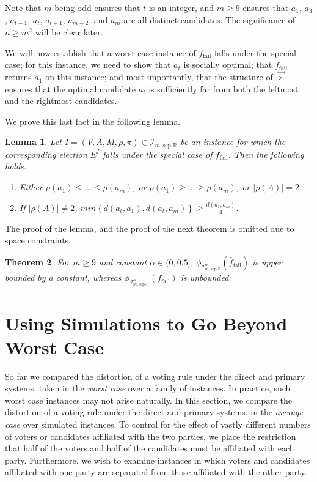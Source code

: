 \documentclass[letterpaper]{article} %
\newtheorem{theorem}{Theorem}
\newtheorem{lemma}[theorem]{Lemma}
\theoremstyle{definition}
\newcommand{\set}[1]{\left\{#1\right\}}
\renewcommand{\vec}{\overrightarrow}
\renewcommand{\hat}{\widehat}
\newcommand{\bbR}{\mathbb{R}}
\newcommand{\calI}{\mathcal{I}}
\newcommand{\vsucc}{\vec{\succ}}
\newcommand{\sep}{\textrm{sep-}}
\newcommand{\eucline}{\bbR}
\newcommand{\euclinesep}{\sep\eucline}
\newcommand{\I}{\calI}
\newcommand{\fail}{{\textrm{fail}}}
\begin{document}
Note that $m$ being odd ensures that $t$ is an integer, and $m \ge 9$ ensures that $a_1$, $a_3$, $a_{t-1}$, $a_t$, $a_{t+1}$, $a_{m-2}$, and $a_m$ are all distinct candidates. The significance of $n \ge m^2$ will be clear later. 

We will now establish that a worst-case instance of $f_\fail$ falls under the special case; for this instance, we need to show that $a_t$ is socially optimal; that $f_\fail$ returns $a_1$ on this instance; and most importantly, that the structure of $\vsucc$ ensures that the optimal candidate $a_t$ is sufficiently far from both the leftmost and the rightmost candidates. 

We prove this last fact in the following lemma. 

\begin{lemma}
	Let $I = (V,A,M,\rho,\pi) \in \I_{m,\euclinesep}$ be an instance for which the corresponding election $E^I$ falls under the special case of $f_\fail$. Then the following holds.
	\begin{enumerate}
		\item Either $\rho(a_1)\leq\ldots\leq\rho(a_{m})$, or $\rho(a_{1})\geq\ldots\geq\rho(a_{m})$, or $|\rho(A)|=2$.%
		\item If $|\rho(A)|\neq 2$, %
		$min\set{d(a_t,a_1),d(a_t,a_m)} \ge \frac{d(a_1,a_m)}{4}$.
	\end{enumerate}
	\label{lem:special-clause}
\end{lemma}

The proof of the lemma, and the proof of the next theorem is omitted due to space constraints.

\begin{theorem}
	For $m \ge 9$ and constant $\alpha \in (0,0.5]$, $\phi_{\I^{\alpha}_{m,\euclinesep}}(\hat{f}_\fail)$ is upper bounded by a constant, whereas $\phi_{\I^{\alpha}_{m,\euclinesep}}(f_\fail)$ is unbounded.
	\label{thm:primary-much-better}
\end{theorem}

\section{Using Simulations to Go Beyond Worst Case}

So far we compared the distortion of a voting rule under the direct and primary systems, taken in the \emph{worst case} over a family of instances. In practice, such worst case instances may not arise naturally. In this section, we compare the distortion of a voting rule under the direct and primary systems, in the \emph{average case} over simulated instances. To control for the effect of vastly different numbers of voters or candidates affiliated with the two parties, we place the restriction that half of the voters and half of the candidates must be affiliated with each party. Furthermore, we wish to examine instances in which voters and candidates affiliated with one party are separated from those affiliated with the other party. 
\end{document}
